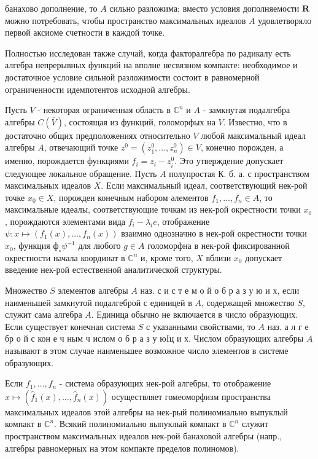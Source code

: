 \documentclass[10pt]{article}
\begin{document}
банахово дополнение, то $A$ сильно разложима; вместо условия дополняемости $\boldsymbol{R}$ можно потребовать, чтобы пространство максимальных идеалов $A$ удовлетворяло первой аксиоме счетности в каждой точке.



Полностью исследован также случай, когда факторалгебра по радикалу есть алгебра непрерывных функций на вполне несвязном компакте: необходимое и достаточное условие сильной разложимости состоит в равномерной ограниченности идемпотентов исходной алгебры.



Пусть $V$ - некоторая ограниченная область в $\mathbb{C}^{n}$ и $A$ - замкнутая подалгебра алгебры $C(\bar{V})$, состоящая из функций, голоморфых на $V$. Известно, что в достаточно общих предположениях относительно $V$ любой максимальный идеал алгебры $A$, отвечающий точке $z^{0}=\left(z_{1}^{0}, \ldots, z_{n}^{0}\right) \in V$, конечно порожден, а именно, порождается функциями $f_{i}=z_{i}-z_{i}^{0}$. Это утверждение допускает следующее локальное обращение. Пусть $A$ полупростая К. б. а. с пространством максимальных идеалов $X$. Если максимальный идеал, соответствующий нек-рой точке $x_{0} \in X$, порожден конечным набором әлементов $f_{1}, \ldots, f_{n} \in A$, то максимальные идеалы, соответствующие точкам из нек-рой окрестности точки $x_{0}$, порождаются элементами вида $f_{i}-\lambda_{i} e$, отображение $\psi: x \mapsto\left(f_{1}(x), \ldots, f_{n}(x)\right)$ взаимно однозначно в нек-рой окрестности точки $x_{0}$, функция $\boldsymbol{ф}_{\circ} \psi^{-1}$ для любого $g \in A$ голоморфна в нек-рой фиксированной окрестности начала координат в $\mathbb{C}^{n}$ и, кроме того, $X$ вблизи $x_{0}$ допускает введение нек-рой естественной аналитической структуры.



Множество $S$ элементов алгебры $A$ наз. с и с т е м о й о б р а з у ю и х, если наименьшей замкнутой подалгеброй с единицей в $A$, содержащей множество $S$, служит сама алгебра $A$. Единица обычно не включается в число образующих. Если существует конечная система $S$ с указанными свойствами, то $A$ наз. а л г е бр о й с кон е ч ным ч ислом о б р а з у юIц и х. Числом образующих алгебры $A$ называют в этом случае наименьшее возможное число элементов в системе образующих.



Если $f_{1}, \ldots, f_{n}$ - система образующих нек-рой алгебры, то отображение $x \mapsto\left(\hat{f}_{1}(x), \ldots, \hat{f}_{n}(x)\right)$ осуществляет гомеоморфизм пространства максимальных идеалов этой алгебры на нек-рый полиномиально выпуклый компакт в $\mathbb{C}^{n}$. Всякий полиномиально выпуклый компакт в $\mathbb{C}^{n}$ служит пространством максимальных идеалов нек-рой банаховой алгебры (напр., алгебры равномерных на этом компакте пределов полиномов).
\end{document}
